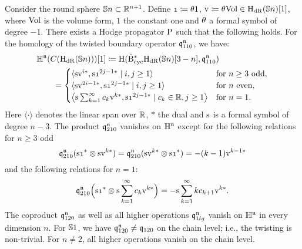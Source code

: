 \documentclass[\MainFolder/Text.tex]{subfiles}
\begin{document}
\begin{IntroThm}\label{IntroThm:A}
Consider the round sphere $\mathbb{S}{n}\subset \mathbb{R}^{n+1}$. Define $\NOne\coloneqq \SuspU 1$, $\mathrm{v}\coloneqq \theta \mathrm{Vol} \in \mathrm{H}_{\mathrm{dR}}(\mathbb{S}{n})[1]$, where $\mathrm{Vol}$ is the volume form, $1$ the constant one and $\theta$ a formal symbol of degree $-1$. There exists a Hodge propagator $\mathrm{P}$ such that the following holds. For the homology of the twisted boundary operator $\mathfrak{q}_{110}^{\mathfrak{n}}$, we have:
\begin{equation*}
\begin{aligned}
& \HIBL^\PMC(\CycC(\HDR(\Sph{n})))[1] \coloneqq \H(\CDBCyc \HDR(\Sph{n})[3-n],\OPQ_{110}^\PMC) \\
& \qquad =\begin{cases}
\langle \Susp \NVol^{i*}, \Susp \NOne^{2j-1*} \mid i, j \ge 1\rangle & \text{for }n\ge 3 \text{ odd}, \\
\langle \Susp \NVol^{2 i-1*}, \Susp \NOne^{2j-1*} \mid i, j \ge 1\rangle &\text{for }n\text{ even}, \\
 \bigl\langle \Susp\sum_{k=1}^\infty c_k \NVol^{k*}, \Susp \NOne^{2j-1*}\mid c_k\in \R, j \ge 1\bigr\rangle & \text{for }n=1. 
\end{cases}
\end{aligned}
\end{equation*}
Here $\langle \cdot \rangle$ denotes the linear span over $\mathbb{R}$, $*$ the dual and $\mathrm{s}$ is a formal symbol of degree $n-3$. The product $\mathfrak{q}_{210}^{\mathfrak{n}}$ vanishes on $\mathbb{H}^{\mathfrak{n}}$ except for the following relations for $n\ge 3$ odd
$$ \OPQ_{210}^\PMC(\Susp \NOne^* \otimes \Susp \NVol^{k*}) = \OPQ_{210}^\PMC(\Susp \NVol^{k*} \otimes \Susp \NOne^*) = -(k-1) \NVol^{k-1*} $$
and the following relations for $n=1$:
$$ \OPQ_{210}^\PMC\Bigl(\Susp \NOne^* \otimes \Susp\sum_{k=1}^\infty c_k \NVol^{k*}\Bigr) = - \Susp \sum_{k=1}^\infty k c_{k+1} \NVol^{k*}.  $$
The coproduct $\mathfrak{q}_{120}^{\mathfrak{n}}$ as well as all higher operations $\mathfrak{q}_{1lg}^{\mathfrak{n}}$ vanish on $\mathbb{H}^{\mathfrak{n}}$ in every  dimension $n$. For $\mathbb{S}{1}$, we have $\mathfrak{q}_{120}^{\mathfrak{n}} \neq \mathfrak{q}_{120}$ on the chain level; i.e., the twisting is non-trivial. For $n\neq 2$, all higher operations vanish on the chain level.


\end{IntroThm}
\end{document}
